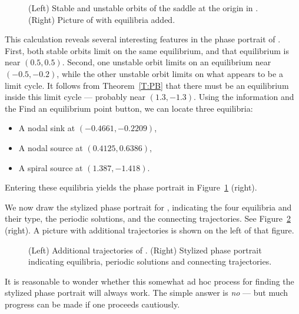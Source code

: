 \documentclass{ximera}
\begin{document}
\begin{figure}[htb]
           \centerline{%
	   }
           \caption{(Left) Stable and unstable orbits of the saddle at
		the origin in \protect{}. (Right) Picture 
		of \protect{} with equilibria added.}
           \label{F:default0}
\end{figure}
 
This calculation reveals several interesting features in the
phase portrait of .  First, both stable orbits limit on the 
same equilibrium, and that equilibrium is near $(0.5,0.5)$.  Second, one 
unstable orbit limits on an equilibrium near $(-0.5,-0.2)$, while the other 
unstable orbit limits on what appears to be a limit cycle.  It follows from 
Theorem~\ref{T:PB} that there must be an equilibrium inside this limit cycle 
--- probably near $(1.3,-1.3)$.  Using the information and the {\sf
Find an equilibrium point} button, we can locate three
equilibria:
\begin{itemize}
\item	A nodal sink at $(-0.4661,-0.2209)$,
\item	A nodal source at $(0.4125,0.6386)$,
\item	A spiral source at $(1.387,-1.418)$. 
\end{itemize}
Entering these equilibria yields the phase portrait in 
Figure~\ref{F:default0} (right). 

We now draw the stylized phase portrait
 for ,
indicating the four equilibria and their type, the periodic
solutions, and the connecting trajectories. See
Figure~\ref{F:default2} (right).  A picture with additional 
trajectories is shown on the left of that figure.

\begin{figure}[htb]
           \centerline{%
		}
           \caption{(Left) Additional trajectories of 
\protect{}. (Right) Stylized phase portrait
indicating equilibria, periodic solutions and connecting trajectories.}
           \label{F:default2}
\end{figure}

It is reasonable to wonder whether this somewhat ad hoc process
for finding the stylized phase portrait will always work.  The
simple answer is {\em no} --- but much progress can be made if
one proceeds cautiously.  
\end{document}
